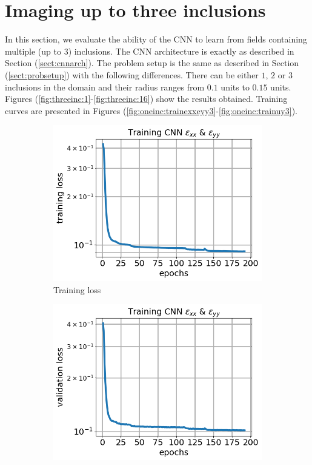 \documentclass[12pt]{article}
\newcommand{\nhgfigheight}{4.0cm}
\begin{document}
\section{Imaging up to three inclusions}
In this section, we evaluate the ability of the CNN to learn from fields containing multiple (up to $3$) inclusions. The CNN architecture is exactly as described in Section (\ref{sect:cnnarch}). The problem setup is the same as described in Section (\ref{sect:probsetup}) with the following differences. There can be either $1$, $2$ or $3$ inclusions in the domain and their radius ranges from $0.1$ units to $0.15$ units. Figures (\ref{fig:threeinc:1}-\ref{fig:threeinc:16}) show the results obtained. Training curves are presented in Figures (\ref{fig:oneinc:trainexxeyy3}-\ref{fig:oneinc:trainuy3}).
%
\begin{figure}[h]
  \centering
  \begin{subfigure}[b]{0.45\linewidth}
    \includegraphics[totalheight=\nhgfigheight]{Figures/final3/training/exxeyy/field_strainxxyy_plot_loss.png}
    \caption{Training loss}
  \end{subfigure}
  \begin{subfigure}[b]{0.45\linewidth}
    \includegraphics[totalheight=\nhgfigheight]{Figures/final3/training/exxeyy/field_strainxxyy_plot_val_loss.png}

\end{subfigure}
\end{figure}
\end{document}
